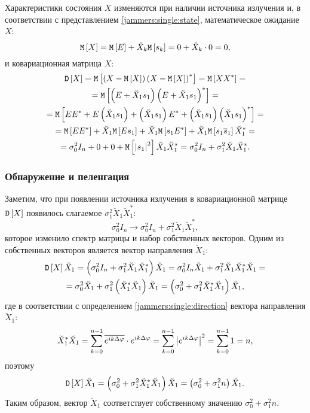Характеристики состояния $X$ изменяются при наличии источника излучения и, в соответствии с представлением \eqref{jammers:single:state}, математическое ожидание
$X$:
\[
    \mathtt{M} \left [ X \right ]
    = \mathtt{M} \left [ E \right ] + \breve{X}_k \mathtt{M} \left [ s_k \right ]
    = 0 + \breve{X}_k \cdot 0
    = 0,
\]
и ковариационная матрица $X$:
\begin{multline*}
    \mathtt{D} \left [ X \right ]
    = \mathtt{M} \left [ \left ( X - \mathtt{M} \left [ X \right ] \right ) \left ( X - \mathtt{M} \left [ X \right ] \right )^* \right ]
    = \mathtt{M} \left [ X X^* \right ] = \\
    = \mathtt{M} \left [ \left ( E + \breve{X}_1 s_1 \right ) \left ( E + \breve{X}_1 s_1 \right )^* \right ] = \\
    = \mathtt{M} \left [ E E^* + E \left ( \breve{X}_1 s_1 \right ) + \left ( \breve{X}_1 s_1 \right ) E^* + \left ( \breve{X}_1 s_1 \right ) \left ( \breve{X}_1 s_1 \right )^* \right ] = \\
    = \mathtt{M} \left [ E E^* \right ] + \breve{X}_1 \mathtt{M} \left [ E s_1 \right ] + \breve{X}_1 \mathtt{M} \left [ s_1 E^* \right ] + \breve{X}_1 \mathtt{M} \left [ s_1 \overline{s}_1 \right ] \breve{X}_1^* = \\
    = \sigma_0^2 I_n + 0 + 0 + \mathtt{M} \left [ \left | s_1 \right |^2 \right ] \breve{X}_1 \breve{X}_1^*
    = \sigma_0^2 I_n + \sigma_1^2 \breve{X}_1 \breve{X}_1^*
    .
\end{multline*}

\subsubsection{Обнаружение и пеленгация}

Заметим, что при появлении источника излучения в ковариационной матрице $\mathtt{D} \left [ X \right ]$ появилось слагаемое $\sigma_1^2 \breve{X}_1 \breve{X}_1^*$:
\[
    \sigma_0^2 I_n \rightarrow \sigma_0^2 I_n + \sigma_1^2 \breve{X}_1 \breve{X}_1^* ,
\]
которое изменило спектр матрицы и набор собственных векторов. Одним из собственных векторов является вектор направления $\breve{X}_1$:
\begin{multline*}
    \mathtt{D} \left [ X \right ] \breve{X}_1
    = \left ( \sigma_0^2 I_n + \sigma_1^2 \breve{X}_1 \breve{X}_1^* \right ) \breve{X}_1
    = \sigma_0^2 I_n \breve{X}_1 + \sigma_1^2 \breve{X}_1 \breve{X}_1^* \breve{X}_1 = \\
    = \sigma_0^2 \breve{X}_1 + \sigma_1^2 \left ( \breve{X}_1^* \breve{X}_1 \right ) \breve{X}_1
    = \left ( \sigma_0^2 + \sigma_1^2 \breve{X}_1^* \breve{X}_1 \right ) \breve{X}_1 ,
\end{multline*}
где в соответствии с определением \eqref{jammers:single:direction} вектора направления $\breve{X}_1$:
\begin{equation}
    \label{jammers:single:direction_self_product}
    \breve{X}_1^* \breve{X}_1
    = \sum_{k=0}^{n-1} \overline{e^{i k \Delta \varphi}} \cdot e^{i k \Delta \varphi}
    = \sum_{k=0}^{n-1} \left | e^{i k \Delta \varphi} \right |^2
    = \sum_{k=0}^{n-1} 1
    = n ,
\end{equation}
поэтому
\[
    \mathtt{D} \left [ X \right ] \breve{X}_1
    = \left ( \sigma_0^2 + \sigma_1^2 \breve{X}_1^* \breve{X}_1 \right ) \breve{X}_1
    = \left ( \sigma_0^2 + \sigma_1^2 n \right ) \breve{X}_1 .
\]
Таким образом, вектор $\breve{X}_1$ соответствует собственному значению $\sigma_0^2 + \sigma_1^2 n$.

